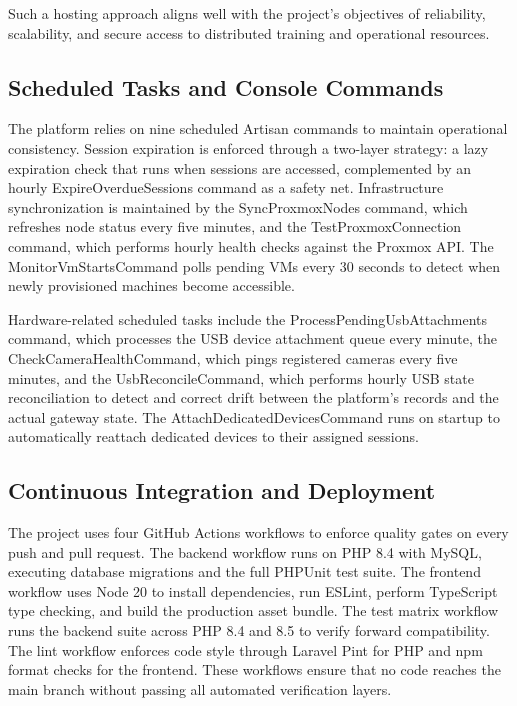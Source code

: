 Such a hosting approach aligns well with the project's objectives of reliability, scalability, and secure access to distributed training and operational resources.

\subsection{Scheduled Tasks and Console Commands}

The platform relies on nine scheduled Artisan commands to maintain operational consistency. Session expiration is enforced through a two-layer strategy: a lazy expiration check that runs when sessions are accessed, complemented by an hourly ExpireOverdueSessions command as a safety net. Infrastructure synchronization is maintained by the SyncProxmoxNodes command, which refreshes node status every five minutes, and the TestProxmoxConnection command, which performs hourly health checks against the Proxmox API. The MonitorVmStartsCommand polls pending VMs every 30 seconds to detect when newly provisioned machines become accessible.

Hardware-related scheduled tasks include the ProcessPendingUsbAttachments command, which processes the USB device attachment queue every minute, the CheckCameraHealthCommand, which pings registered cameras every five minutes, and the UsbReconcileCommand, which performs hourly USB state reconciliation to detect and correct drift between the platform's records and the actual gateway state. The AttachDedicatedDevicesCommand runs on startup to automatically reattach dedicated devices to their assigned sessions.

\subsection{Continuous Integration and Deployment}

The project uses four GitHub Actions workflows to enforce quality gates on every push and pull request. The backend workflow runs on PHP 8.4 with MySQL, executing database migrations and the full PHPUnit test suite. The frontend workflow uses Node 20 to install dependencies, run ESLint, perform TypeScript type checking, and build the production asset bundle. The test matrix workflow runs the backend suite across PHP 8.4 and 8.5 to verify forward compatibility. The lint workflow enforces code style through Laravel Pint for PHP and npm format checks for the frontend. These workflows ensure that no code reaches the main branch without passing all automated verification layers.

